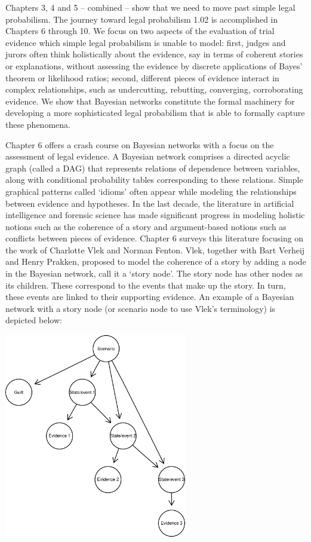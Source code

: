 \documentclass[10pt,dvipsnames,enabledeprecatedfontcommands]{scrartcl}
\begin{document}
Chapters 3, 4 and 5 -- combined -- show that we need to move past simple
legal probabilism. The journey toward legal probabilism 1.02 is
accomplished in Chapters 6 through 10. We focus on two aspects of the
evaluation of trial evidence which simple legal probabilism is unable to
model: first, judges and jurors often think holistically about the
evidence, say in terms of coherent stories or explanations, without
assessing the evidence by discrete applications of Bayes' theorem or
likelihood ratios; second, different pieces of evidence interact in
complex relationships, such as undercutting, rebutting, converging,
corroborating evidence. We show that Bayesian networks constitute the
formal machinery for developing a more sophisticated legal probabilism
that is able to formally capture these phenomena.

Chapter 6 offers a crash course on Bayesian networks with a focus on the
assessment of legal evidence. A Bayesian network comprises a directed
acyclic graph (called a DAG) that represents relations of dependence
between variables, along with conditional probability tables
corresponding to these relations. Simple graphical patterns called
`idioms' often appear while modeling the relationships between evidence
and hypotheses. In the last decade, the literature in artificial
intelligence and forensic science has made significant progress in
modeling holistic notions such as the coherence of a story and
argument-based notions such as conflicts between pieces of evidence.
Chapter 6 surveys this literature focusing on the work of Charlotte Vlek
and Norman Fenton. Vlek, together with Bart Verheij and Henry Prakken,
proposed to model the coherence of a story by adding a node in the
Bayesian network, call it a `story node'. The story node has other nodes
as its children. These correspond to the events that make up the story.
In turn, these events are linked to their supporting evidence. An
example of a Bayesian network with a story node (or scenario node to use
Vlek's terminology) is depicted below:

\begin{center}
\includegraphics[width=8cm]{vlek-scenario-node.pdf}
 \end{center}
\end{document}
